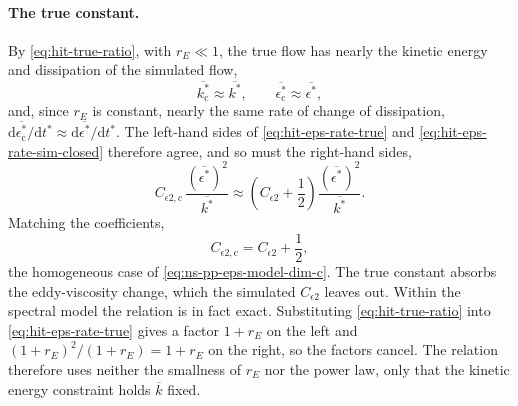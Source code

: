 \documentclass{article}
\begin{document}
\paragraph{The true constant.}
By \eqref{eq:hit-true-ratio}, with $r_E \ll 1$, the true flow has nearly the
kinetic energy and dissipation of the simulated flow,
\begin{equation}
  \overline{k_{\mathrm{c}}^*} \approx \overline{k^*} ,
  \qquad
  \overline{\epsilon_{\mathrm{c}}^*} \approx \overline{\epsilon^*} ,
\end{equation}
and, since $r_E$ is constant, nearly the same rate of change of dissipation,
$\mathrm{d}\overline{\epsilon_{\mathrm{c}}^*}/\mathrm{d}t^* \approx \mathrm{d}\overline{\epsilon^*}/\mathrm{d}t^*$.
The left-hand sides of \eqref{eq:hit-eps-rate-true} and
\eqref{eq:hit-eps-rate-sim-closed} therefore agree, and so must the
right-hand sides,
\begin{equation}\label{eq:hit-Ceps2-diff}
  C_{\epsilon 2,\mathrm{c}}\, \frac{\left(\overline{\epsilon^*}\right)^2}{\overline{k^*}}
  \approx \left( C_{\epsilon 2} + \frac{1}{2} \right) \frac{\left(\overline{\epsilon^*}\right)^2}{\overline{k^*}} .
\end{equation}
Matching the coefficients,
\begin{equation}\label{eq:hit-Ceps2-relation}
  C_{\epsilon 2,\mathrm{c}} = C_{\epsilon 2} + \frac{1}{2} ,
\end{equation}
the homogeneous case of \eqref{eq:ns-pp-eps-model-dim-c}. The true constant
absorbs the eddy-viscosity change, which the simulated $C_{\epsilon 2}$ leaves
out. Within the spectral model the relation is in fact exact. Substituting
\eqref{eq:hit-true-ratio} into \eqref{eq:hit-eps-rate-true} gives a factor
$1 + r_E$ on the left and $(1 + r_E)^2/(1 + r_E) = 1 + r_E$ on the right, so the
factors cancel. The relation therefore uses neither the smallness of $r_E$ nor
the power law, only that the kinetic energy constraint holds $\overline{k}$
fixed.
\end{document}
